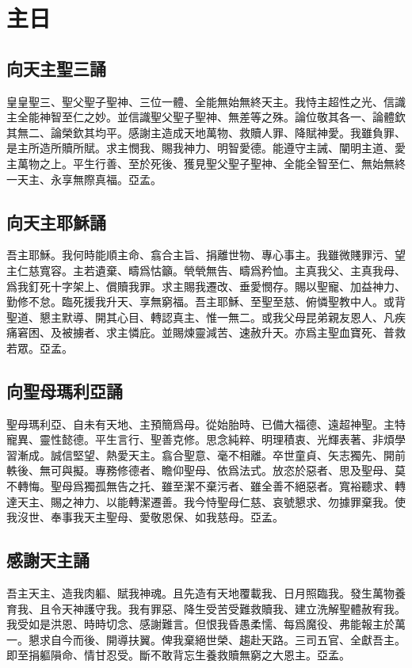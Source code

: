 \chapter[主日經]{主日}
\section*{向天主聖三誦}
皇皇聖三、聖父聖子聖神、三位一體、全能無始無終天主。我恃主超性之光、信識主全能神智至仁之妙。並信識聖父聖子聖神、無差等之殊。論位敬其各一、論體欽其無二、論榮欽其均平。感謝主造成天地萬物、救贖人罪、降賦神愛。我雖負罪、是主所造所贖所賦。求主憫我、賜我神力、明智愛德。能遵守主誡、闡明主道、愛主萬物之上。平生行善、至於死後、獲見聖父聖子聖神、全能全智至仁、無始無終一天主、永享無際真福。{\cspace}亞孟。
\section*{向天主耶穌誦}
吾主耶穌。我何時能順主命、翕合主旨、捐離世物、專心事主。我雖微賤罪污、望主仁慈寬容。主若遺棄、疇爲怙籲。煢煢無告、疇爲矜恤。主真我父、主真我母、爲我釘死十字架上、償贖我罪。求主賜我遷改、垂愛憫存。賜以聖寵、加益神力、勤修不怠。臨死援我升天、享無窮福。吾主耶穌、至聖至慈、俯憐聖教中人。或背聖道、懇主默導、開其心目、轉認真主、惟一無二。或我父母昆弟親友恩人、凡疾痛窘困、及被擄者、求主憐庇。並賜煉靈減苦、速赦升天。亦爲主聖血寶死、普救若眾。{\cspace}亞孟。
\section*{向聖母瑪利亞誦}
聖母瑪利亞、自未有天地、主預簡爲母。從始胎時、已備大福德、遠超神聖。主特寵異、靈性懿德。平生言行、聖善克修。思念純粹、明理積衷、光輝表著、非煩學習漸成。誠信堅望、熱愛天主。翕合聖意、毫不相離。卒世童貞、矢志獨先、開前軼後、無可與擬。專務修德者、瞻仰聖母、依爲法式。放恣於惡者、思及聖母、莫不轉悔。聖母爲獨孤無告之托、雖至潔不棄污者、雖全善不絕惡者。寬裕聽求、轉達天主、賜之神力、以能轉潔遷善。我今恃聖母仁慈、哀號懇求、勿據罪棄我。使我沒世、奉事我天主聖母、愛敬恩保、如我慈母。{\cspace}亞孟。
\section*{感謝天主誦}
吾主天主、造我肉軀、賦我神魂。且先造有天地覆載我、日月照臨我。發生萬物養育我、且令天神護守我。我有罪惡、降生受苦受難救贖我、建立洗解聖體赦宥我。我受如是洪恩、時時切念、感謝難言。但恨我昏愚柔懦、每爲魔役、弗能報主於萬一。懇求自今而後、開導扶翼。俾我棄絕世榮、趨赴天路。三司五官、全獻吾主。即至捐軀隕命、情甘忍受。斷不敢背忘生養救贖無窮之大恩主。{\cspace}亞孟。
